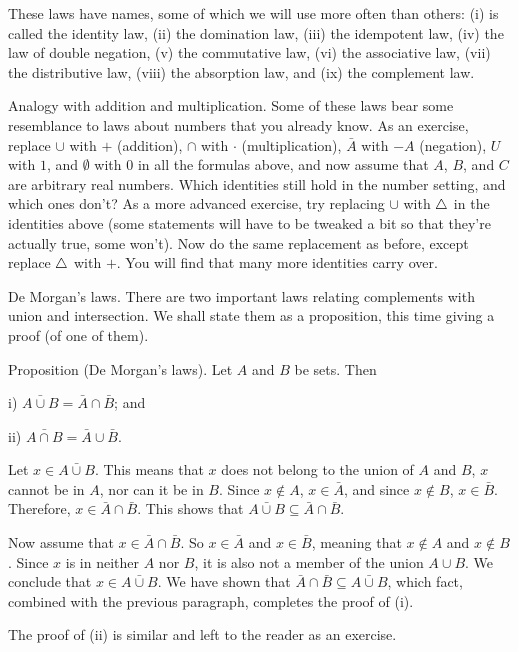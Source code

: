 These laws have names, some of which we will use more often than others:
(i) is called the identity law, (ii) the domination law, (iii) the idempotent law,
(iv) the law of double negation, (v) the commutative law, (vi) the associative law,
(vii) the distributive law, (viii) the absorption law, and (ix) the complement law.

\medskip\boldlabel \llap{*}Analogy with addition and multiplication.
Some of these laws bear some resemblance to laws about numbers that you already know. As an exercise,
replace $\cup$ with $+$ (addition), $\cap$ with $\cdot$ (multiplication), $\bar A$ with $-A$ (negation),
$U$ with $1$, and $\emptyset$ with $0$ in all the formulas
above, and now assume that $A$, $B$, and $C$ are arbitrary real numbers. Which identities still hold in
the number setting, and which ones don't? As a more advanced exercise, try replacing $\cup$
with $\mathrel{\triangle}$ in the identities above (some statements will have to be tweaked a bit so that they're
actually true, some won't). Now do the same
replacement as before, except replace $\mathrel{\triangle}$ with $+$. You will find that many more identities
carry over.

\medskip\boldlabel{} De Morgan's laws.
There are two important laws relating complements with union and intersection.
We shall state them as a proposition, this time giving a proof (of one of them).

\parenproclaim Proposition {\advthm} (De Morgan's laws). Let $A$ and $B$ be sets. Then
\medskip
\item{i)} $\bar{A\cup B} = \bar A \cap \bar B$; and
\smallskip
\item{ii)} $\bar{A\cap B} = \bar A \cup \bar B$.
\medskip

\proof
Let $x\in \bar{A\cup B}$. This means that $x$ does not belong to the union of $A$ and $B$,
$x$ cannot be in $A$, nor can it be in $B$. Since $x\notin A$, $x\in \bar A$, and since $x\notin B$,
$x\in \bar B$. Therefore, $x\in \bar A\cap \bar B$. This shows that $\bar{A\cup B}\subseteq \bar A\cap \bar B$.

Now assume that $x\in \bar A\cap \bar B$. So $x\in \bar A$ and $x\in \bar B$, meaning that $x\notin A$
and $x\notin B$. Since $x$ is in neither $A$ nor $B$, it is also not a member of the union $A\cup B$.
We conclude that $x\in \bar{A\cup B}$. We have shown that $\bar A\cap \bar B \subseteq \bar{A\cup B}$,
which fact, combined with the previous paragraph, completes the proof of (i).

The proof of (ii) is similar and left to the reader as an exercise.\slug

